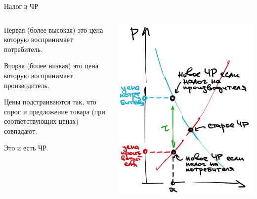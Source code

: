 \documentclass{beamer}
\begin{document}
\begin{frame}{Налог в ЧР}
\begin{columns}
\begin{column}{0.5\textwidth}
   Первая (более высокая) это цена которую воспринимает потребитель.
   
   \medskip
   
   Вторая (более низкая) это цена которую воспринимает производитель.
   
   \medskip
   
   Цены подстраиваются так, что спрос и предложение товара (при соответствующих ценах) совпадают. 
   
   \medskip
   
   Это и есть ЧР.
\end{column}
\begin{column}{0.5\textwidth}  %
    \begin{center}
     \includegraphics[width=1\textwidth]{bothtax}
     \end{center}
\end{column}
\end{columns}
\end{frame}
\end{document}
